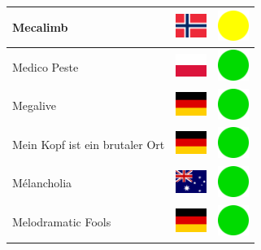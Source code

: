 \documentclass[12pt, a4paper, twoside]{report}
\begin{document}
\begin{center}
\begin{longtable}{|p{5cm}|p{2cm}|p{2cm}|}
 Mecalimb                                                   & \includegraphics[width=1cm]{../img/flags/no} &   \includegraphics[width=1cm]{../likes/m} \\ \hline
 Medico Peste                                               & \includegraphics[width=1cm]{../img/flags/pl} &   \includegraphics[width=1cm]{../likes/y} \\ \hline
 Megalive                                                   & \includegraphics[width=1cm]{../img/flags/de} &   \includegraphics[width=1cm]{../likes/y} \\ \hline
 Mein Kopf ist ein brutaler Ort                             & \includegraphics[width=1cm]{../img/flags/de} &   \includegraphics[width=1cm]{../likes/y} \\ \hline
 Mélancholia                                                & \includegraphics[width=1cm]{../img/flags/au} &   \includegraphics[width=1cm]{../likes/y} \\ \hline
 Melodramatic Fools                                         & \includegraphics[width=1cm]{../img/flags/de} &   \includegraphics[width=1cm]{../likes/y} \\ \hline

\end{longtable}
\end{center}
\end{document}
